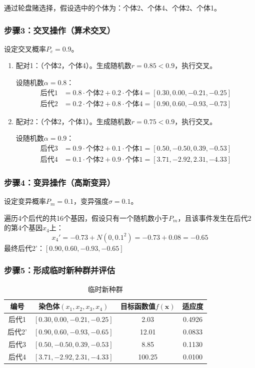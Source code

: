 通过轮盘赌选择，假设选中的个体为：个体2、个体4、个体2、个体1。

\subsubsection{步骤3：交叉操作（算术交叉）}

设定交叉概率$P_c = 0.9$。

\begin{enumerate}
    \item 配对1：（个体2，个体4）。生成随机数$r=0.85<0.9$，执行交叉。
    
    设随机数$\alpha = 0.8$：
    \[
    \begin{aligned}
    \text{后代1} &= 0.8 \cdot \text{个体2} + 0.2 \cdot \text{个体4} = [0.30, 0.00, -0.21, -0.25] \\
    \text{后代2} &= 0.2 \cdot \text{个体2} + 0.8 \cdot \text{个体4} = [0.90, 0.60, -0.93, -0.73]
    \end{aligned}
    \]
    
    \item 配对2：（个体2，个体1）。生成随机数$r=0.75<0.9$，执行交叉。
    
    设随机数$\alpha = 0.9$：
    \[
    \begin{aligned}
    \text{后代3} &= 0.9 \cdot \text{个体2} + 0.1 \cdot \text{个体1} = [0.50, -0.50, 0.39, -0.53] \\
    \text{后代4} &= 0.1 \cdot \text{个体2} + 0.9 \cdot \text{个体1} = [3.71, -2.92, 2.31, -4.33]
    \end{aligned}
    \]
\end{enumerate}

\subsubsection{步骤4：变异操作（高斯变异）}

设定变异概率$P_m = 0.1$，变异强度$\sigma = 0.1$。

遍历4个后代的共16个基因，假设只有一个随机数小于$P_m$，且该事件发生在后代2的第4个基因$x_4$上：
\[
x_4' = -0.73 + N(0, 0.1^2) = -0.73 + 0.08 = -0.65
\]
最终后代2'：$[0.90, 0.60, -0.93, -0.65]$

\subsubsection{步骤5：形成临时新种群并评估}

\begin{table}[H]
\centering
\caption{临时新种群}
\begin{tabular}{|c|c|c|c|}
\hline
编号 & 染色体$(x_1, x_2, x_3, x_4)$ & 目标函数值$f(\mathbf{x})$ & 适应度 \\
\hline
后代1 & $[0.30, 0.00, -0.21, -0.25]$ & 2.03 & 0.4926 \\
\hline
后代2' & $[0.90, 0.60, -0.93, -0.65]$ & 12.01 & 0.0833 \\
\hline
后代3 & $[0.50, -0.50, 0.39, -0.53]$ & 8.85 & 0.1130 \\
\hline
后代4 & $[3.71, -2.92, 2.31, -4.33]$ & 100.25 & 0.0100 \\
\hline
\end{tabular}
\end{table}

